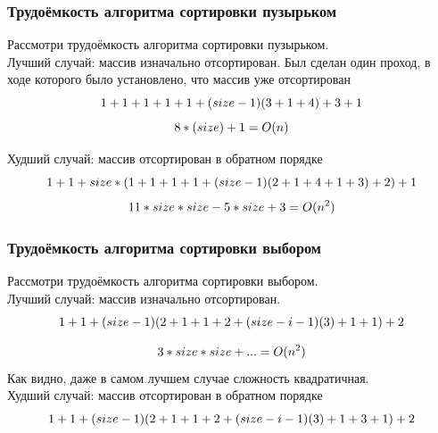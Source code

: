 \documentclass[12pt,a4paper]{article}
\numberwithin{equation}{section}
\begin{document}
\subsubsection{Трудоёмкость алгоритма сортировки пузырьком}
\qquad Рассмотри трудоёмкость алгоритма сортировки пузырьком.\\
Лучший случай: массив изначально отсортирован. Был сделан один проход, в ходе которого было установлено, что массив уже отсортирован\\
\begin{equation}
	1 + 1 + 1 + 1 + 1 + (size - 1)(3 + 1 + 4) + 3 + 1\\
\end{equation}
\begin{equation}
8*(size) + 1 = O(n)\\
\end{equation}

Худший случай: массив отсортирован в обратном порядке\\
\begin{equation}
	1 + 1 + size*(1 + 1 + 1 + 1 + (size - 1)(2 + 1 + 4 + 1 + 3) + 2) + 1\\
\end{equation}
\begin{equation}
	11*size*size - 5*size + 3 = O(n^2)\\
\end{equation}

\subsubsection{Трудоёмкость алгоритма сортировки выбором}
\qquad Рассмотри трудоёмкость алгоритма сортировки выбором.\\
Лучший случай: массив изначально отсортирован.\\
\begin{equation}
	1 + 1 + (size - 1)(2 + 1 + 1 + 2 + (size - i - 1)(3) + 1 + 1) + 2\\
\end{equation}

\begin{equation}
	3*size*size + ... = O(n^2)\\
\end{equation}
Как видно, даже в самом лучшем случае сложность квадратичная.\\

Худший случай: массив отсортирован в обратном порядке\\
\begin{equation}
	1 + 1 + (size - 1)(2 + 1 + 1 + 2 + (size - i - 1)(3) + 1 + 3 + 1) + 2\\
\end{equation}
\end{document}
